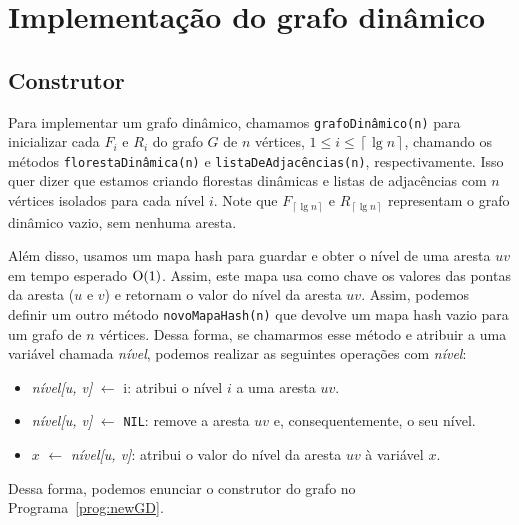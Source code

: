 \newpage

\section{Implementação do grafo dinâmico}
\label{sec:dynamic-graph-implementation}

\subsection{Construtor}
\label{sec:code-constructor}

Para implementar um grafo dinâmico, chamamos \texttt{grafoDinâmico(n)} para inicializar cada $F_i$ e $R_i$ do grafo $G$ de $n$ vértices, $1 \leq i \leq \left\lceil \lg n \right\rceil$, chamando os métodos \texttt{florestaDinâmica(n)} e \texttt{listaDeAdjacências(n)}, respectivamente. Isso quer dizer que estamos criando florestas dinâmicas e listas de adjacências com $n$ vértices isolados para cada nível $i$. Note que $F_{\left\lceil \lg n \right\rceil}$ e $R_{\left\lceil \lg n \right\rceil}$ representam o grafo dinâmico vazio, sem nenhuma aresta. 

Além disso, usamos um mapa hash para guardar e obter o nível de uma aresta $uv$ em tempo esperado $\mathrm{O}(1)$. Assim, este mapa usa como chave os valores das pontas da aresta ($u$ e $v$) e retornam o valor do nível da aresta $uv$. Assim, podemos definir um outro método \texttt{novoMapaHash(n)} que devolve um mapa hash vazio para um grafo de $n$ vértices. Dessa forma, se chamarmos esse método e atribuir a uma variável chamada \textit{nível}, podemos realizar as seguintes operações com \textit{nível}:

\begin{itemize}
    \item \textit{nível[u, v]} $\leftarrow$ i: atribui o nível $i$ a uma aresta $uv$. 
    
    \item \textit{nível[u, v]} $\leftarrow$ \texttt{NIL}: remove a aresta $uv$ e, consequentemente, o seu nível.
    
    \item $x$ $\leftarrow$ \textit{nível[u, v]}: atribui o valor do nível da aresta $uv$ à variável $x$. 
\end{itemize}


Dessa forma, podemos enunciar o construtor do grafo no Programa~\ref{prog:newGD}. 

